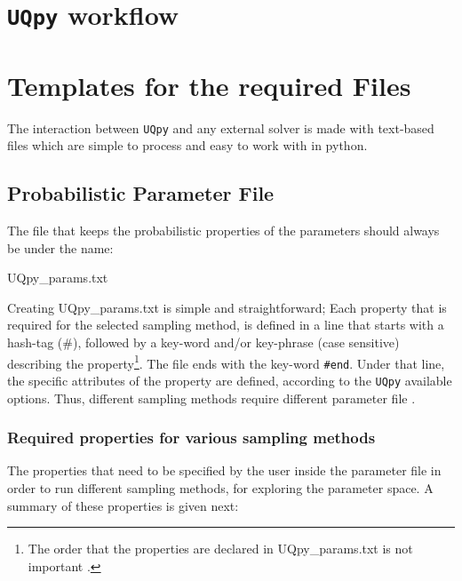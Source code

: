 \documentclass[preprint,12pt]{elsarticle}
\begin{document}
\section{\texttt{UQpy} workflow}


\section{Templates for the required  Files}

\noindent
The interaction between \texttt{UQpy}  and any external solver is made  with text-based files which are simple to process and easy to work with in python.  

\subsection{Probabilistic Parameter File}

\noindent
The file that keeps the probabilistic properties of the parameters should always be under the name:

\vspace{4mm}
{\centering
{\color{magenta}UQpy\_params.txt}\par}

\vspace{4mm}
\noindent
Creating {\color{magenta}UQpy\_params.txt} is simple and straightforward; Each property that is required for the selected sampling method, is defined in a line  that starts  with a hash-tag (\#),  followed by a key-word and/or key-phrase (case sensitive) describing the property\footnote{The order that the properties are declared in {\color{magenta}UQpy\_params.txt} is not important .}. The file ends with the key-word \texttt{\#end}. Under that line, the specific attributes of the property are defined, according to the \texttt{UQpy} available options. Thus, different sampling methods require different parameter file . 

\subsubsection{Required properties for various sampling methods}

The properties that need to be specified by the user inside the parameter file in order to run different sampling methods, for exploring the parameter space. A summary of these properties  is given next:  
\end{document}
